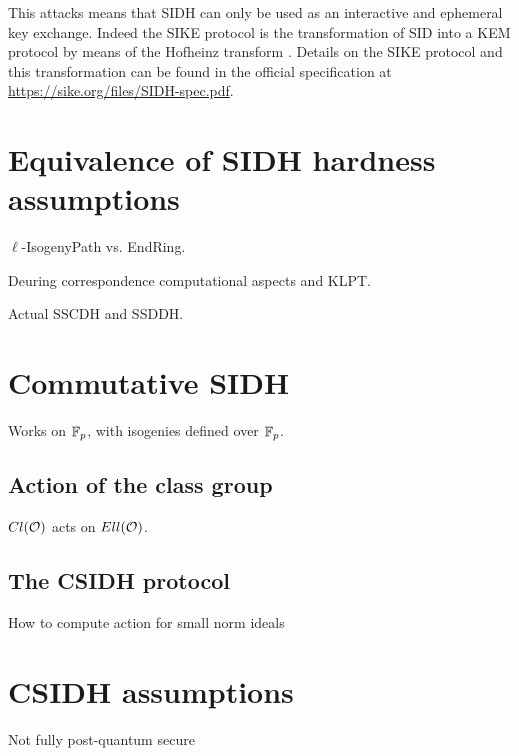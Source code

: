 This attacks means that SIDH can only be used as an interactive and ephemeral key exchange. Indeed the SIKE protocol is the transformation of SID into a KEM protocol by means of the Hofheinz transform \cite{Hofheinz}. Details on the SIKE protocol and this transformation can be found in the official specification at \url{https://sike.org/files/SIDH-spec.pdf}.

\section{Equivalence of SIDH hardness assumptions}
$\ell$-IsogenyPath vs. EndRing.

Deuring correspondence computational aspects and KLPT.

Actual SSCDH and SSDDH.

\section{Commutative SIDH}
Works on $\mathbb{F}_p$, with isogenies defined over $\mathbb{F}_p$.

\subsection{Action of the class group}
$Cl(\mathcal{O})$ acts on $Ell(\mathcal{O})$.

\subsection{The CSIDH protocol}
How to compute action for small norm ideals

\section{CSIDH assumptions}
Not fully post-quantum secure

\cite{breaking_DDH}

